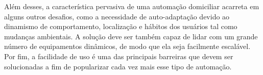 Além desses, a característica pervasiva de uma automação domiciliar acarreta em alguns outros desafios, como
a necessidade de auto-adaptação devido ao dinamismo de comportamento, localização e hábitos dos usuários tal
como mudanças ambientais. A solução deve ser também capaz de lidar com um grande número de equipamentos
dinâmicos, de modo que ela seja facilmente escalável. Por fim, a facilidade de uso é uma das principais
barreiras que devem ser solucionadas a fim de popularizar cada vez mais esse tipo de automação.
\cite{lalanda2010}
